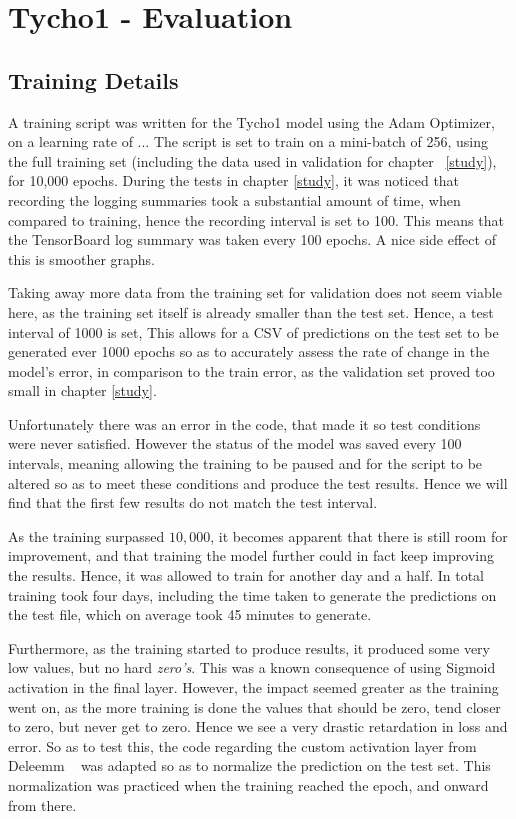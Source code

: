 \documentclass[12pt,a4paper,oneside,oldfontcommands]{memoir}
\begin{document}
\chapter{Tycho1 - Evaluation} \label{tycho1}


\section{Training Details}

A training script was written for the Tycho1 model using the Adam Optimizer, on a learning rate of ... The script is set to train on a mini-batch of 256, using the full training set (including the data used in validation for chapter ~\ref{study}), for 10,000 epochs. During the tests in chapter \ref{study}, it was noticed that recording the logging summaries took a substantial amount of time, when compared to training, hence the recording interval is set to 100. This means that the TensorBoard log summary was taken every 100 epochs. A nice side effect of this is smoother graphs.

Taking away more data from the training set for validation does not seem viable here, as the training set itself is already smaller than the test set. Hence, a test interval of 1000 is set, This allows for a CSV of predictions on the test set to be generated ever 1000 epochs so as to accurately assess the rate of change in the model's error, in comparison to the train error, as the validation set proved too small in chapter \ref{study}. 

Unfortunately there was an error in the code, that made it so test conditions were never satisfied. However the status of the model was saved every 100 intervals, meaning allowing the training to be paused and for the script to be altered so as to meet these conditions and produce the test results. Hence we will find that the first few results do not match the test interval. 

As the training surpassed \(10,000\), it becomes apparent that there is still room for improvement, and that training the model further could in fact keep improving the results. Hence, it was allowed to train for another day and a half. In total training took four days, including the time taken to generate the predictions on the test file, which on average took 45 minutes to generate.

Furthermore, as the training started to produce results, it produced some very low values, but no hard \textit{zero's}. This was a known consequence of using Sigmoid activation in the final layer. However, the impact seemed greater as the training went on, as the more training is done the values that should be zero, tend closer to zero, but never get to zero. Hence we see a very drastic retardation in loss and error. So as to test this, the code regarding the custom activation layer from Deleemm ~\cite{Sanders-GZ} was adapted so as to normalize the prediction on the test set. This normalization was practiced when the training reached the  epoch, and onward from there. 
\end{document}

